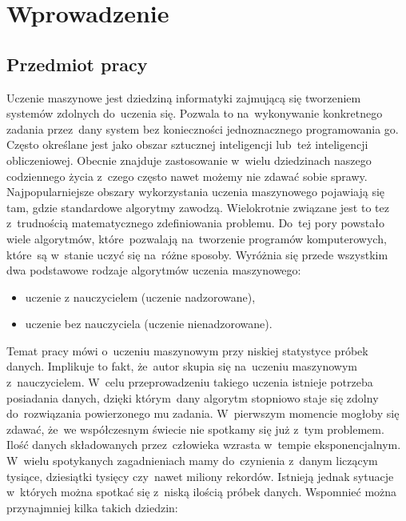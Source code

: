 \section{Wprowadzenie}\label{intro}
\subsection{Przedmiot pracy}\label{matter}
Uczenie maszynowe jest dziedziną informatyki zajmującą się tworzeniem systemów zdolnych do~uczenia się. Pozwala to na~wykonywanie konkretnego zadania przez~dany system bez konieczności jednoznacznego programowania go. 
Często określane jest jako obszar sztucznej inteligencji lub~też inteligencji obliczeniowej\cite{stefanowski}. Obecnie znajduje zastosowanie w~wielu dziedzinach naszego codziennego życia z~czego często nawet możemy nie zdawać sobie sprawy.
Najpopularniejsze obszary wykorzystania uczenia maszynowego pojawiają się tam, gdzie standardowe algorytmy zawodzą. Wielokrotnie związane jest to tez z~trudnością matematycznego zdefiniowania problemu. 
 Do~tej pory powstało wiele algorytmów, które~pozwalają na~tworzenie programów komputerowych, które~są w~stanie uczyć się na~różne sposoby. Wyróżnia się przede wszystkim dwa podstawowe rodzaje algorytmów uczenia maszynowego:
\begin{itemize}
\item uczenie z nauczycielem (uczenie nadzorowane),
\item uczenie bez nauczyciela (uczenie nienadzorowane).
\end{itemize}
Temat pracy mówi o~uczeniu maszynowym przy niskiej statystyce próbek danych. Implikuje to fakt, że~autor skupia się na~uczeniu maszynowym z~nauczycielem. W~celu przeprowadzeniu takiego uczenia istnieje potrzeba posiadania danych, dzięki którym~dany algorytm stopniowo staje się zdolny do~rozwiązania powierzonego mu zadania. W~pierwszym momencie mogłoby się zdawać, że~we współczesnym świecie nie spotkamy się już z~tym problemem. Ilość danych składowanych przez~człowieka wzrasta w~tempie eksponencjalnym. W~wielu spotykanych zagadnieniach mamy do~czynienia z~danym liczącym tysiące, dziesiątki tysięcy czy~nawet miliony rekordów. Istnieją jednak sytuacje w~których można spotkać się z~niską ilością próbek danych. Wspomnieć można przynajmniej kilka takich dziedzin:
